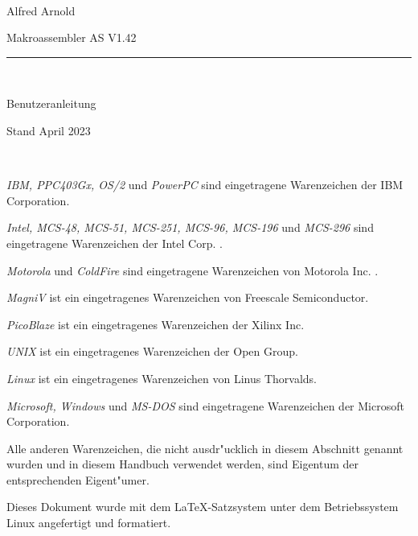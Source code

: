 \documentclass[12pt,a4paper,twoside]{report}
\begin{document}
\thispagestyle{empty}

\
\vspace{7cm}\par

\begin{raggedright}
{\large Alfred Arnold}\\
\vspace{1cm}\par
{\huge Makroassembler AS V1.42}\\
\rule{9.5cm}{0.3mm}\\
\vspace{2mm}\par
{\huge Benutzeranleitung}

\vspace{1cm}\par

{\large Stand April 2023}
\end{raggedright}

\clearpage
\thispagestyle{empty}

\ \vspace{4cm}

{\em IBM, PPC403Gx, OS/2} und {\em PowerPC} sind eingetragene Warenzeichen
der IBM Corporation.

{\em Intel, MCS-48, MCS-51, MCS-251, MCS-96, MCS-196} und {\em MCS-296}
sind eingetragene Warenzeichen der Intel Corp. .

{\em Motorola} und {\em ColdFire} sind eingetragene Warenzeichen von
Motorola Inc. .

{\em MagniV} ist ein eingetragenes Warenzeichen von Freescale Semiconductor.

{\em PicoBlaze} ist ein eingetragenes Warenzeichen der Xilinx Inc.

{\em UNIX} ist ein eingetragenes Warenzeichen der Open Group.

{\em Linux} ist ein eingetragenes Warenzeichen von Linus Thorvalds.

{\em Microsoft, Windows} und {\em MS-DOS} sind eingetragene Warenzeichen
der Microsoft Corporation.

Alle anderen Warenzeichen, die nicht ausdr"ucklich in diesem Abschnitt
genannt wurden und in diesem Handbuch verwendet werden, sind Eigentum
der entsprechenden Eigent"umer.

\vspace{6cm}

Dieses Dokument wurde mit dem LaTeX-Satzsystem unter dem Betriebssystem
Linux angefertigt und formatiert.
\end{document}
